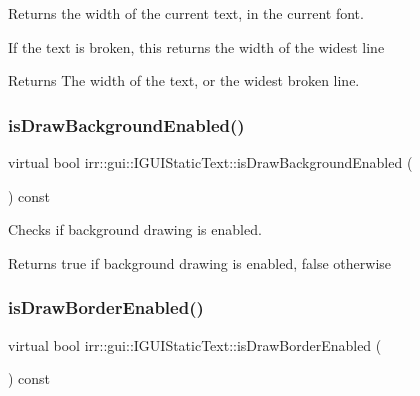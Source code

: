 Returns the width of the current text, in the current font. 

If the text is broken, this returns the width of the widest line \begin{DoxyReturn}{Returns}
The width of the text, or the widest broken line. 
\end{DoxyReturn}
\mbox{\label{classirr_1_1gui_1_1IGUIStaticText_ab6da7f10a72d023729d12c85e2926aec}} 
\subsubsection{\texorpdfstring{is\+Draw\+Background\+Enabled()}{isDrawBackgroundEnabled()}}
{\footnotesize\ttfamily virtual bool irr\+::gui\+::\+I\+G\+U\+I\+Static\+Text\+::is\+Draw\+Background\+Enabled (\begin{DoxyParamCaption}{ }\end{DoxyParamCaption}) const\hspace{0.3cm}{\ttfamily [pure virtual]}}



Checks if background drawing is enabled. 

\begin{DoxyReturn}{Returns}
true if background drawing is enabled, false otherwise 
\end{DoxyReturn}
\mbox{\label{classirr_1_1gui_1_1IGUIStaticText_a52478a36f77cfbc62e1f57a486e0a083}} 
\subsubsection{\texorpdfstring{is\+Draw\+Border\+Enabled()}{isDrawBorderEnabled()}}
{\footnotesize\ttfamily virtual bool irr\+::gui\+::\+I\+G\+U\+I\+Static\+Text\+::is\+Draw\+Border\+Enabled (\begin{DoxyParamCaption}{ }\end{DoxyParamCaption}) const\hspace{0.3cm}{\ttfamily [pure virtual]}}



